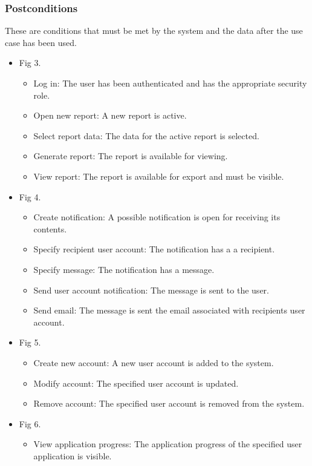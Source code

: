 \documentclass[12pt]{article}
\begin{document}
\subsubsection{Postconditions}
These are conditions that must be met by the system and the data after the use case has been used.\\
\begin{itemize}
		
	\item Fig 3.
		\begin{itemize}
			\item Log in: The user has been authenticated and has the appropriate security role.
			\item Open new report: A new report is active.
			\item Select report data: The data for the active report is selected.
			\item Generate report: The report is available for viewing.
			\item View report: The report is available for export and must be visible.	
		\end{itemize}
	
	\item Fig 4.
			\begin{itemize}
				\item Create notification: A possible notification is open for receiving its contents.
				\item Specify recipient user account: The notification has a a recipient.				
				\item Specify message: The notification has a message.
				\item Send user account notification: The message is sent to the user.
				\item Send email: The message is sent the email associated with recipients user account.	
			\end{itemize}
	
	\item Fig 5.
			\begin{itemize}
				\item Create new account: A new user account is added to the system.
				\item Modify account: The specified user account is updated.				
				\item Remove account: The specified user account is removed from the system.						
			\end{itemize}
	
	\item Fig 6.
		\begin{itemize}
			\item View application progress: The application progress of the specified user application is visible.
		\end{itemize}
		

\end{itemize}
\end{document}
